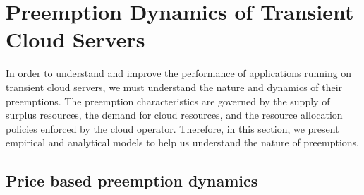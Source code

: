 \section{Preemption Dynamics of Transient Cloud Servers}


In order to understand and improve the performance of applications running on transient cloud servers, we must understand the nature and dynamics of their preemptions.
The preemption characteristics are governed by the supply of surplus resources, the demand for cloud resources, and the resource allocation policies enforced by the cloud operator.
Therefore, in this section, we present empirical and analytical models to help us understand the nature of preemptions. 








\subsection{Price based preemption dynamics}

